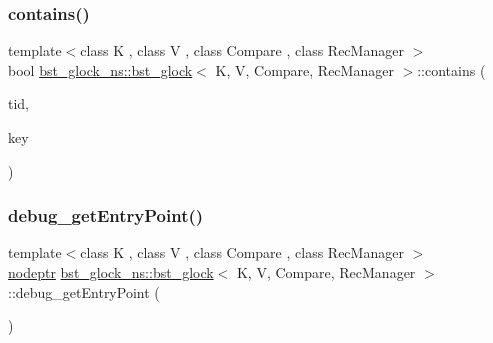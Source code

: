\subsubsection{\texorpdfstring{contains()}{contains()}}
{\footnotesize\ttfamily template$<$class K , class V , class Compare , class Rec\+Manager $>$ \\
bool \hyperlink{classbst__glock__ns_1_1bst__glock}{bst\+\_\+glock\+\_\+ns\+::bst\+\_\+glock}$<$ K, V, Compare, Rec\+Manager $>$\+::contains (\begin{DoxyParamCaption}\item[{const int}]{tid,  }\item[{const K \&}]{key }\end{DoxyParamCaption})\hspace{0.3cm}{\ttfamily [inline]}}

\mbox{\label{classbst__glock__ns_1_1bst__glock_aca7d5081582066674f6a4cc78d2e7f68}} 
\subsubsection{\texorpdfstring{debug\+\_\+get\+Entry\+Point()}{debug\_getEntryPoint()}}
{\footnotesize\ttfamily template$<$class K , class V , class Compare , class Rec\+Manager $>$ \\
\hyperlink{bst__rwlock__impl_8h_a04158d2a20768fe447133ff555823b05}{nodeptr} \hyperlink{classbst__glock__ns_1_1bst__glock}{bst\+\_\+glock\+\_\+ns\+::bst\+\_\+glock}$<$ K, V, Compare, Rec\+Manager $>$\+::debug\+\_\+get\+Entry\+Point (\begin{DoxyParamCaption}{ }\end{DoxyParamCaption})\hspace{0.3cm}{\ttfamily [inline]}}

\mbox{\label{classbst__glock__ns_1_1bst__glock_a7d4cc1614d6bfd96a4708ce0e1fa8cc8}} 
